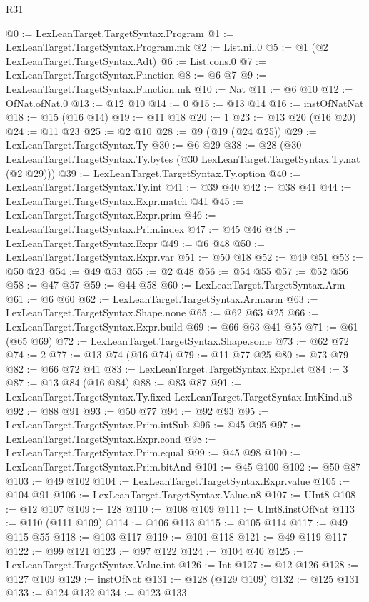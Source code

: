 \begin{lexlean}{R31}
\begin{coremodule}
@0 := LexLeanTarget.TargetSyntax.Program
@1 := LexLeanTarget.TargetSyntax.Program.mk
@2 := List.nil.{0}
@5 := @1 (@2 LexLeanTarget.TargetSyntax.Adt)
@6 := List.cons.{0}
@7 := LexLeanTarget.TargetSyntax.Function
@8 := @6 @7
@9 := LexLeanTarget.TargetSyntax.Function.mk
@10 := Nat
@11 := @6 @10
@12 := OfNat.ofNat.{0}
@13 := @12 @10
@14 := 0
@15 := @13 @14
@16 := instOfNatNat
@18 := @15 (@16 @14)
@19 := @11 @18
@20 := 1
@23 := @13 @20 (@16 @20)
@24 := @11 @23
@25 := @2 @10
@28 := @9 (@19 (@24 @25))
@29 := LexLeanTarget.TargetSyntax.Ty
@30 := @6 @29
@38 := @28
    (@30 LexLeanTarget.TargetSyntax.Ty.bytes (@30 LexLeanTarget.TargetSyntax.Ty.nat (@2 @29)))
@39 := LexLeanTarget.TargetSyntax.Ty.option
@40 := LexLeanTarget.TargetSyntax.Ty.int
@41 := @39 @40
@42 := @38 @41
@44 := LexLeanTarget.TargetSyntax.Expr.match @41
@45 := LexLeanTarget.TargetSyntax.Expr.prim
@46 := LexLeanTarget.TargetSyntax.Prim.index
@47 := @45 @46
@48 := LexLeanTarget.TargetSyntax.Expr
@49 := @6 @48
@50 := LexLeanTarget.TargetSyntax.Expr.var
@51 := @50 @18
@52 := @49 @51
@53 := @50 @23
@54 := @49 @53
@55 := @2 @48
@56 := @54 @55
@57 := @52 @56
@58 := @47 @57
@59 := @44 @58
@60 := LexLeanTarget.TargetSyntax.Arm
@61 := @6 @60
@62 := LexLeanTarget.TargetSyntax.Arm.arm
@63 := LexLeanTarget.TargetSyntax.Shape.none
@65 := @62 @63 @25
@66 := LexLeanTarget.TargetSyntax.Expr.build
@69 := @66 @63 @41 @55
@71 := @61 (@65 @69)
@72 := LexLeanTarget.TargetSyntax.Shape.some
@73 := @62 @72
@74 := 2
@77 := @13 @74 (@16 @74)
@79 := @11 @77 @25
@80 := @73 @79
@82 := @66 @72 @41
@83 := LexLeanTarget.TargetSyntax.Expr.let
@84 := 3
@87 := @13 @84 (@16 @84)
@88 := @83 @87
@91 := LexLeanTarget.TargetSyntax.Ty.fixed LexLeanTarget.TargetSyntax.IntKind.u8
@92 := @88 @91
@93 := @50 @77
@94 := @92 @93
@95 := LexLeanTarget.TargetSyntax.Prim.intSub
@96 := @45 @95
@97 := LexLeanTarget.TargetSyntax.Expr.cond
@98 := LexLeanTarget.TargetSyntax.Prim.equal
@99 := @45 @98
@100 := LexLeanTarget.TargetSyntax.Prim.bitAnd
@101 := @45 @100
@102 := @50 @87
@103 := @49 @102
@104 := LexLeanTarget.TargetSyntax.Expr.value
@105 := @104 @91
@106 := LexLeanTarget.TargetSyntax.Value.u8
@107 := UInt8
@108 := @12 @107
@109 := 128
@110 := @108 @109
@111 := UInt8.instOfNat
@113 := @110 (@111 @109)
@114 := @106 @113
@115 := @105 @114
@117 := @49 @115 @55
@118 := @103 @117
@119 := @101 @118
@121 := @49 @119 @117
@122 := @99 @121
@123 := @97 @122
@124 := @104 @40
@125 := LexLeanTarget.TargetSyntax.Value.int
@126 := Int
@127 := @12 @126
@128 := @127 @109
@129 := instOfNat
@131 := @128 (@129 @109)
@132 := @125 @131
@133 := @124 @132
@134 := @123 @133

\end{coremodule}
\end{lexlean}
